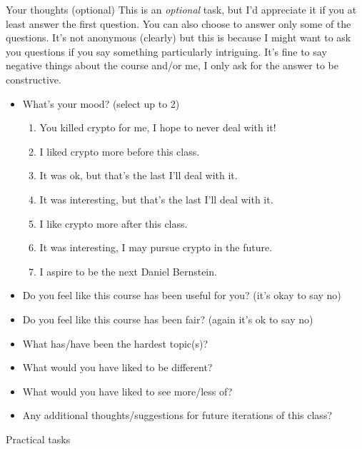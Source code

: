 \documentclass{homework}
\begin{document}
\begin{task}{Your thoughts (optional)}
  This is an \emph{optional} task, but I'd appreciate it if you at least answer the first question.
  You can also choose to answer only some of the questions.
  It's not anonymous (clearly) but this is because I might want to ask you questions if you say something particularly intriguing.
  It's fine to say negative things about the course and/or me, I only ask for the answer to be constructive.

  \begin{itemize}
    \item What's your mood? (select up to 2)
    \begin{enumerate}
      \item You killed crypto for me, I hope to never deal with it!
      \item I liked crypto more before this class.
      \item It was ok, but that's the last I'll deal with it.
      \item It was interesting, but that's the last I'll deal with it.
      \item I like crypto more after this class.
      \item It was interesting, I may pursue crypto in the future.
      \item I aspire to be the next Daniel Bernstein.
    \end{enumerate}
    \item Do you feel like this course has been useful for you? (it's okay to say no)
    \item Do you feel like this course has been fair? (again it's ok to say no)
    \item What has/have been the hardest topic(s)?
    \item What would you have liked to be different?
    \item What would you have liked to see more/less of?
    \item Any additional thoughts/suggestions for future iterations of this class?
  \end{itemize}
\end{task}

\newpage
\setcounter{task}{0}

\begin{center}
  Practical tasks
\end{center}
\end{document}
